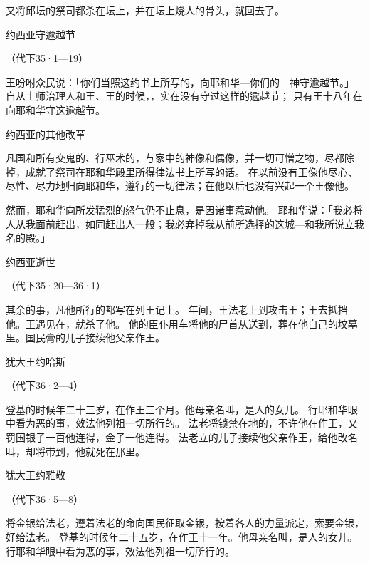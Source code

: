 {又将邱坛的祭司都杀在坛上，并在坛上烧人的骨头，就回{}去了。
\par }{\SH 约西亚守逾越节
\par }{\R （代下35·1—19）
\par }{\PP {}王吩咐众民说：「你们当照这约书上所写的，向耶和华—你们的　神守逾越节。」
自从士师治理{}人和{}王、{}王的时候，{}，实在没有守过这样的逾越节；
只有{}王十八年在{}向耶和华守这逾越节。
\par }{\SH 约西亚的其他改革
\par }{\PP {}凡{}国和{}所有交鬼的、行巫术的，与家中的神像和偶像，并一切可憎之物，{}尽都除掉，成就了祭司{}在耶和华殿里所得律法书上所写的话。
在{}以前没有王像他尽心、尽性、尽力地归向耶和华，遵行{}的一切律法；在他以后也没有兴起一个王像他。
\par }{\PP {}然而，耶和华向{}所发猛烈的怒气仍不止息，是因{}诸事惹动他。
耶和华说：「我必将{}人从我面前赶出，如同赶出{}人一般；我必弃掉我从前所选择的这城—{}和我所说立我名的殿。」
\par }{\SH 约西亚逝世
\par }{\R （代下35·20—36·1）
\par }{\PP {}其余的事，凡他所行的都写在{}列王记上。
年间，{}王法老{}上到{}攻击{}王；{}王去抵挡他。{}王遇见{}在{}，就杀了他。
他的臣仆用车将他的尸首从{}送到{}，葬在他自己的坟墓里。国民膏{}的儿子{}接续他父亲作王。
\par }{\SH 犹大王约哈斯
\par }{\R （代下36·2—4）
\par }{\PP {}登基的时候年二十三岁，在{}作王三个月。他母亲名叫{}，是{}人{}的女儿。
行耶和华眼中看为恶的事，效法他列祖一切所行的。
法老{}将{}锁禁在{}地的{}，不许他在{}作王，又罚{}国银子一百他连得，金子一他连得。
法老{}立{}的儿子{}接续他父亲{}作王，给他改名叫{}，却将{}带到{}，他就死在那里。
\par }{\SH 犹大王约雅敬
\par }{\R （代下36·5—8）
\par }{\PP {}将金银给法老，遵着法老的命向国民征取金银，按着各人的力量派定，索要金银，好给法老{}。
登基的时候年二十五岁，在{}作王十一年。他母亲名叫{}，是{}人{}的女儿。
行耶和华眼中看为恶的事，效法他列祖一切所行的。

}
